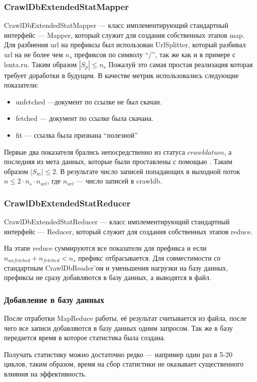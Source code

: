 \subsubsection*{CrawlDbExtendedStatMapper}
CrawlDbExtendedStatMapper --- класс имплементирующий стандартный интерфейс  --- Mapper, который служит для создания собственных этапов map.
Для разбиения url на префиксы был использован UrlSplitter, который разбивал url на не более чем $n_{s}$ префиксов по символу ``/'', так же как и в примере с lenta.ru. Таким образом $|S_{p}|\leqslant n_{s}$ Пожалуй это самая простая реализация которая требует доработки в будущем.
В качестве метрик использовались следующие показатели:
\begin{itemize}
 \item unfetched ---документ по ссылке не был скачан.
 \item fetched --- документ по ссылке была скачана.
 \item fit --- ссылка была признана ``полезной''
\end{itemize}
Первые два показателя брались непосредственно из статуса $crawldatum$, а последняя из мета данных, которые были проставлены с помощью . Таким образом $|S_{m}|\leqslant2$. В результате число записей попадающих в выходной поток $n\leqslant 2\cdot n_{s}\cdot n_{url}$, где $n_{url}$ --- число записей в crawldb.

\subsubsection*{CrawlDbExtendedStatReducer}
CrawlDbExtendedStatReducer --- класс имплементирующий стандартный интерфейс  --- Reducer, который служит для создания собственных этапов reduce.

На этапе reduce суммируются все показатели для префикса и если $n_{unfetched}+n_{fetched} < n_{s}$ префикс отбрасывается. Для совместимости со стандартным CrawlDbReader'ом и уменьшения нагрузки на базу данных, префиксы не сразу добавляются в базу данных, а выводятся в файл. 
\subsubsection*{Добавление в базу данных}
После отработки MapReduce работы, её результат считывается из файла, после чего все записи добавляются в базу данных одним запросом. Так же в базу передается время в которое статистика была создана.

Получать статистику можно достаточно редко --- например один раз в 5-20 циклов, таким образом, время на сбор статистики не оказывает существенного влияния на эффективность.
